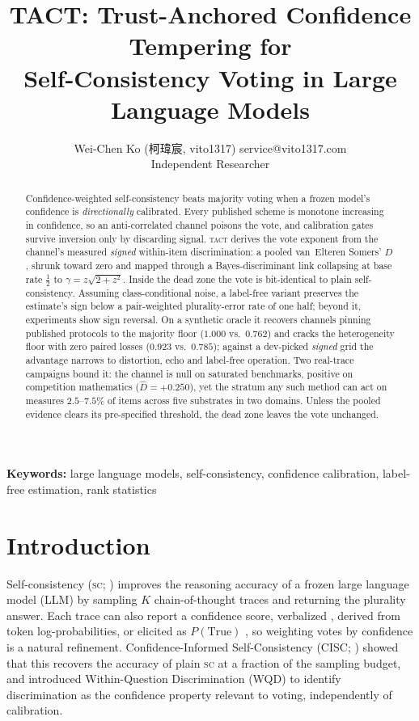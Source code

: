 \documentclass{article}
\title{TACT: Trust-Anchored Confidence Tempering for\\ Self-Consistency Voting
in Large Language Models}
\author{\name Wei-Chen Ko ({\zhfont 柯瑋宸}, vito1317) \email service@vito1317.com \\
        \addr Independent Researcher}
\newcommand{\Dhat}{\widehat{D}}
\newcommand{\SC}{\textsc{sc}}
\newcommand{\TACT}{\textsc{tact}}
\begin{document}
\maketitle
\begin{abstract}
Confidence-weighted self-consistency beats majority voting when a frozen
model's confidence is \emph{directionally} calibrated. Every published scheme is monotone increasing in confidence, so an
anti-correlated channel poisons the vote, and calibration gates survive
inversion only by discarding signal. \TACT{} derives the vote exponent from the channel's measured
\emph{signed} within-item discrimination: a pooled
van~Elteren Somers' $D$, shrunk toward zero and mapped through a
Bayes-discriminant link collapsing at base rate $\tfrac12$ to
$\gamma=z\sqrt{2+z^2}$. Inside the dead zone the vote is
bit-identical to plain self-consistency. Assuming class-conditional noise, a label-free variant preserves the estimate's sign below a
pair-weighted plurality-error rate of one half; beyond it,
experiments show sign reversal. On a synthetic oracle it recovers channels pinning published protocols to
the majority floor ($1.000$ vs.\ $0.762$) and cracks the
heterogeneity floor with zero paired losses ($0.923$ vs.\ $0.785$); against a
dev-picked \emph{signed} grid the advantage narrows to distortion, echo and
label-free operation. Two real-trace campaigns bound it: the channel is null on saturated
benchmarks, positive on competition mathematics ($\Dhat=+0.250$), yet the
stratum any such method can act on measures $2.5$--$7.5\%$ of items across five
substrates in two domains. Unless the pooled evidence clears its pre-specified threshold, the dead zone
leaves the vote unchanged.
\end{abstract}

\noindent\textbf{Keywords:} 
large language models, self-consistency, confidence calibration, label-free estimation, rank statistics


\section{Introduction}

Self-consistency (\SC; \citealp{wang2023selfconsistency}) improves the reasoning accuracy of a frozen large language model (LLM) by sampling $K$ chain-of-thought traces and returning the plurality answer. Each trace can also report a confidence score, verbalized \citep{tian2023just,xiong2024can}, derived from token log-probabilities, or elicited as $P(\text{True})$ \citep{kadavath2022language}, so weighting votes by confidence is a natural refinement. Confidence-Informed Self-Consistency (CISC; \citealp{taubenfeld2025cisc}) showed that this recovers the accuracy of plain \SC{} at a fraction of the sampling budget, and introduced Within-Question Discrimination (WQD) to identify discrimination as the confidence property relevant to voting, independently of calibration.
\end{document}
